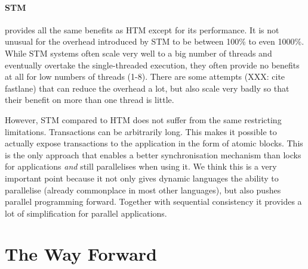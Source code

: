 \documentclass{sigplanconf}
\begin{document}

\paragraph{STM} provides all the same benefits as HTM except for its performance.
It is not unusual for the overhead introduced by STM to be between
100\% to even 1000\%. While STM systems often scale very well to a big
number of threads and eventually overtake the single-threaded
execution, they often provide no benefits at all for low numbers of
threads (1-8). There are some attempts (XXX: cite fastlane) that can
reduce the overhead a lot, but also scale very badly so that their
benefit on more than one thread is little.

However, STM compared to HTM does not suffer from the same restricting
limitations. Transactions can be arbitrarily long.  This makes it
possible to actually expose transactions to the application in the
form of atomic blocks. This is the only approach that enables a better
synchronisation mechanism than locks for applications \emph{and} still
parallelises when using it. We think this is a very important point
because it not only gives dynamic languages the ability to parallelise
(already commonplace in most other languages), but also pushes
parallel programming forward. Together with sequential consistency it
provides a lot of simplification for parallel applications.



\section{The Way Forward}
\end{document}
